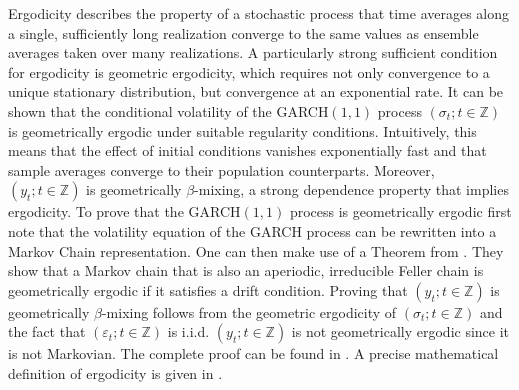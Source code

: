 \documentclass[12pt,a4paper]{article}
\theoremstyle{definition}
\begin{document}
Ergodicity describes the property of a stochastic process that time averages along a single, sufficiently long realization converge to the same values as ensemble averages taken over many realizations. A particularly strong sufficient condition for ergodicity is geometric ergodicity, which requires not only convergence to a unique stationary distribution, but convergence at an exponential rate. It can be shown that the conditional volatility of the GARCH$(1,1)$ process $(\sigma_t;t\in \mathbb{Z})$ is geometrically ergodic under suitable regularity conditions. Intuitively, this means that the effect of initial conditions vanishes exponentially fast and that sample averages converge to their population counterparts. Moreover, $(y_t;t\in\mathbb{Z})$ is geometrically $\beta$-mixing, a strong dependence property that implies ergodicity. To prove that the GARCH$(1,1)$ process is geometrically ergodic first note that the volatility equation of the GARCH process can be rewritten into a Markov Chain representation. One can then make use of a Theorem from \citet{FeignTweedie1985}. They show that a Markov chain that is also an aperiodic, irreducible Feller chain is geometrically ergodic if it satisfies a drift condition. Proving that $(y_t;t\in\mathbb{Z})$ is geometrically $\beta$-mixing follows from the geometric ergodicity of $(\sigma_t;t\in\mathbb{Z})$ and the fact that $(\varepsilon_t;t\in\mathbb{Z})$ is i.i.d. $(y_t;t\in\mathbb{Z})$ is not geometrically ergodic since it is not Markovian. The complete proof can be found in \citet{francq2019garch}. A precise mathematical definition of ergodicity is given in .
\end{document}
